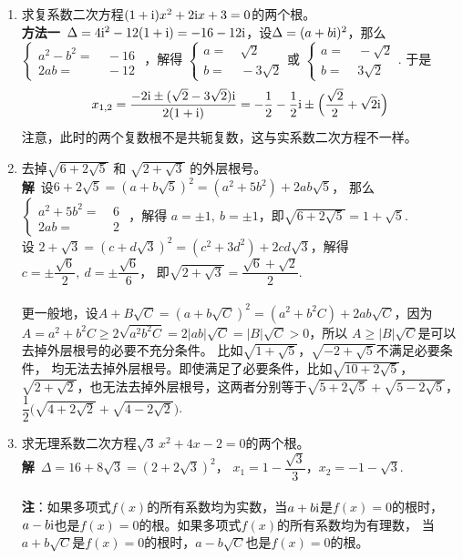 \begin{enumerate}[label={【\textbf{例\thechapter.\arabic*}】},
 leftmargin=\inteval{\myenumleftmargin}pt,
 itemsep=\inteval{\myenumitempsep}pt,
 itemindent=\inteval{\myenumitemindent}pt]
\item 求复系数二次方程$ (1+\mathrm{i})x^2+2\mathrm{i} x+3=0 $的两个根。\\
\textbf{方法一}\ $ \Delta=4\mathrm{i}^2-12(1+\mathrm{i})=-16-12\mathrm{i} $，设$ \Delta=(a+b\mathrm{i})^2 $，那么
$ \left\{ \begin{aligned}
    a^2-b^2 =&\ -16 \\
    2ab =&\ -12
\end{aligned} \right. $ ，解得
$ \left\{ \begin{aligned}
    a=&\ \sqrt{2} \\
    b=&\ -3\sqrt{2}
\end{aligned} \right. $或
$ \left\{ \begin{aligned}
    a=&\ -\sqrt{2} \\
    b=&\ 3\sqrt{2}
\end{aligned} \right. $. 
于是
\begin{gather*}
    x_{1,2}=\dfrac{-2\mathrm{i}\pm (\sqrt{2}-3\sqrt{2})\mathrm{i}}{2(1+\mathrm{i})}=-\dfrac{1}{2}
    -\dfrac{1}{2}\mathrm{i}\pm \Big(\dfrac{\sqrt{2}}{2}+\sqrt{2} \mathrm{i}\Big)
\end{gather*}
注意，此时的两个复数根不是共轭复数，这与实系数二次方程不一样。

\item 去掉$ \sqrt{6+2\sqrt{5}} $ 和 $ \sqrt{2+\sqrt{3}} $ 
的外层根号。\\
\textbf{解}\ 设$ 6+2\sqrt{5}=(a+b\sqrt{5})^2=(a^2+5b^2)+2ab\sqrt{5}$，
那么
$ \left\{ \begin{aligned}
    a^2+5b^2 =&\ 6 \\
    2ab =&\ 2
\end{aligned} \right. $ ，解得
$ a=\pm 1,\ b=\pm 1 $，即$ \sqrt{6+2\sqrt{5}}=1+\sqrt{5} $. \\
设 $ 2+\sqrt{3}=(c+d\sqrt{3})^2=(c^2+3d^2)+
2cd\sqrt{3} $，解得$ c=\pm \dfrac{\sqrt{6}}{2},\ d=\pm \dfrac{\sqrt{6}}{6} $，
即$  \sqrt{2+\sqrt{3}} = \dfrac{\sqrt{6}+\sqrt{2}}{2} $.  \\
\\
更一般地，设$ A+B\sqrt{C}=(a+b\sqrt{C})^2=(a^2+b^2C)+2ab\sqrt{C} $，因为
$ A=a^2+b^2C \geq 2\sqrt{a^2b^2C} =2|ab|\sqrt{C}=|B|\sqrt{C}>0 $，所以
$ A\geq |B|\sqrt{C} $是可以去掉外层根号的必要不充分条件。
比如$ \sqrt{1+\sqrt{5}} $，$ \sqrt{-2+\sqrt{5}} $不满足必要条件，
均无法去掉外层根号。即使满足了必要条件，比如$ \sqrt{10+2\sqrt{5}} $，
$ \sqrt{2+\sqrt{2}} $，也无法去掉外层根号，这两者分别等于$ \sqrt{5+2\sqrt{5}}+
\sqrt{5-2\sqrt{5}} $，$ \dfrac{1}{2}\bigl(\sqrt{4+2\sqrt{2}}+
\sqrt{4-2\sqrt{2}}\bigr) $. 

\item 求无理系数二次方程$ \sqrt{3}\, x^2+4x-2=0 $的两个根。\\
\textbf{解}\ $ \Delta=16+8\sqrt{3}=(2+2\sqrt{3})^2 $，
$ x_1=1-\dfrac{\sqrt{3}}{3} $，$ x_2=-1-\sqrt{3} $. \\
\\
\textbf{注}：如果多项式$ f(x) $的所有系数均为实数，当$ a+b\mathrm{i} $是$ f(x)=0 $的根时，
$ a-b\mathrm{i} $也是$ f(x)=0 $的根。如果多项式$ f(x) $的所有系数均为有理数，
当$ a+b\sqrt{C} $是$ f(x)=0 $的根时，$ a-b\sqrt{C} $也是$ f(x)=0 $的根。


\end{enumerate}
